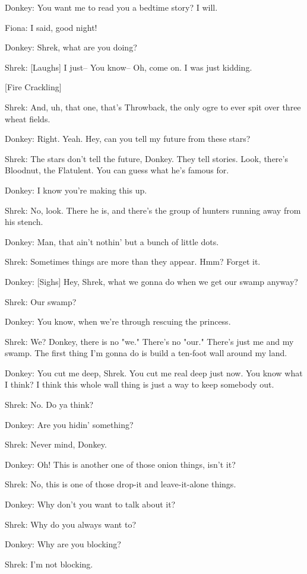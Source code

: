 \documentclass{article}
\begin{document}
Donkey:
You want me to read you a bedtime story? I will.

Fiona:
I said, good night!

Donkey:
Shrek, what are you doing?

Shrek:
[Laughs] I just-- You know-- Oh, come on. I was just kidding.

[Fire Crackling]

Shrek:
And, uh, that one, that's Throwback, the only ogre to ever spit over three wheat fields.

Donkey:
Right. Yeah. Hey, can you tell my future from these stars?

Shrek:
The stars don't tell the future, Donkey. They tell stories. Look, there's Bloodnut, the Flatulent. You can guess what he's famous for.

Donkey:
I know you're making this up.

Shrek:
No, look. There he is, and there's the group of hunters running away from his stench.

Donkey:
Man, that ain't nothin' but a bunch of little dots.

Shrek:
Sometimes things are more than they appear. Hmm? Forget it.

Donkey:
[Sighs] Hey, Shrek, what we gonna do when we get our swamp anyway?

Shrek:
Our swamp?

Donkey:
You know, when we're through rescuing the princess.

Shrek:
We? Donkey, there is no "we." There's no "our." There's just me and my swamp. The first thing I'm gonna do is build a ten-foot wall around my land.

Donkey:
You cut me deep, Shrek. You cut me real deep just now. You know what I think? I think this whole wall thing is just a way to keep somebody out.

Shrek:
No. Do ya think?

Donkey:
Are you hidin' something?

Shrek:
Never mind, Donkey.

Donkey:
Oh! This is another one of those onion things, isn't it?

Shrek:
No, this is one of those drop-it and leave-it-alone things.

Donkey:
Why don't you want to talk about it?

Shrek:
Why do you always want to?

Donkey:
Why are you blocking?

Shrek:
I'm not blocking.
\end{document}
